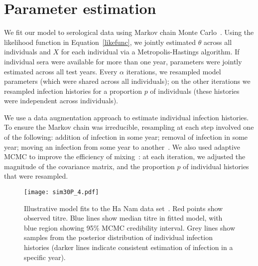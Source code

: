 \documentclass[12pt]{article}
\begin{document}
\section{Parameter estimation}

We fit our model to serological data using Markov chain Monte Carlo~\cite{gilks1996markov}. Using the likelihood function in Equation~\ref{likefunc}, we jointly estimated $\theta$ across all individuals and $X$ for each individual via a Metropolis-Hastings algorithm. If individual sera were available for more than one year, parameters were jointly estimated across all test years. Every $\alpha$ iterations, we resampled model parameters (which were shared across all individuals); on the other iterations we resampled infection histories for a proportion $p$ of individuals (these histories were independent across individuals).

We use a data augmentation approach to estimate individual infection histories. To ensure the Markov chain was irreducible, resampling at each step involved one of the following: addition of infection in some year; removal of infection in some year; moving an infection from some year to another~\cite{gibson1998estimating}. We also used adaptive MCMC to improve the efficiency of mixing~\cite{Roberts:2009wg}: at each iteration, we adjusted the magnitude of the covariance matrix, and the proportion $p$ of individual histories that were resampled.





\begin{figure}[htbp]
\begin{center}
  \texttt{[image: sim30P\_4.pdf]} 
\caption{Illustrative model fits to the Ha Nam data set~\cite{fonville2014antibody}. Red points show observed titre. Blue lines show median titre in fitted model, with blue region showing 95\% MCMC credibility interval. Grey lines show samples from the posterior distribution of individual infection histories (darker lines indicate consistent estimation of infection in a specific year).}
\label{default}
\end{center}
\end{figure}
\end{document}
